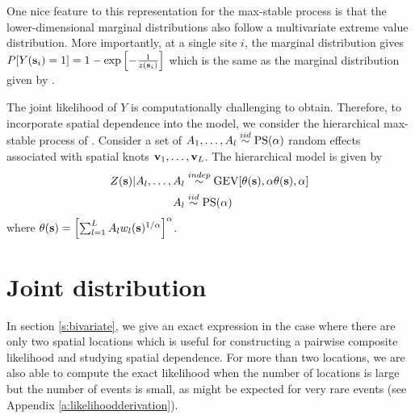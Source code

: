 One nice feature to this representation for the max-stable process is that the lower-dimensional marginal distributions also follow a multivariate extreme value distribution.
More importantly, at a single site $i$, the marginal distribution gives \mbox{$P[Y(\mathbf{s}_i) = 1] = 1 - \exp\left[ -\frac{ 1 }{ z(\mathbf{s}_i)} \right]$} which is the same as the marginal distribution given by \citet{Wang2010}.

The joint likelihood of $Y$ is computationally challenging to obtain.
Therefore, to incorporate spatial dependence into the model, we consider the hierarchical max-stable process of \citet{Reich2012}.
Consider a set of $A_1, \ldots, A_l \stackrel{iid}{\sim} \text{PS}(\alpha)$ random effects associated with spatial knots $\mathbf{v}_1, \ldots, \mathbf{v}_L$.
The hierarchical model is given by
\begin{align} \label{eq:hiermodel}
  Z(\mathbf{s}) | A_l, \ldots, A_l &\stackrel{indep}{\sim} \text{GEV}[\theta(\mathbf{s}), \alpha \theta(\mathbf{s}), \alpha] \\
  A_l &\stackrel{iid}{\sim} \text{PS}(\alpha) \nonumber
\end{align}
where $\theta(\mathbf{s}) = \left[\sum_{l = 1}^L A_l w_l (\mathbf{s})^{1 / \alpha} \right]^\alpha$.



\section{Joint distribution}\label{s:multivariate}

In section \ref{s:bivariate}, we give an exact expression in the case where there are only two spatial locations which is useful for constructing a pairwise composite likelihood and studying spatial dependence.
For more than two locations, we are also able to compute the exact likelihood when the number of locations is large but the number of events is small, as might be expected for very rare events (see Appendix \ref{a:likelihoodderivation}).

